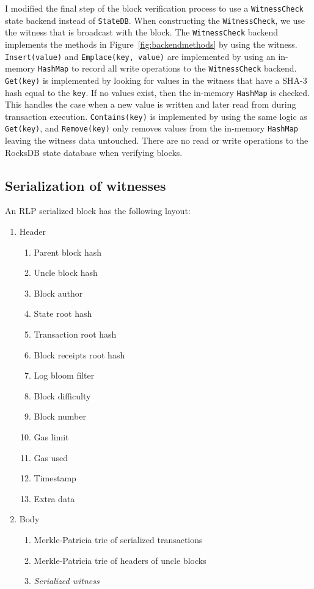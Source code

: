 \documentclass[12pt]{article}
\begin{document}
I modified the final step of the block verification process to use a \texttt{WitnessCheck} state backend instead of \texttt{StateDB}. When constructing the \texttt{WitnessCheck}, we use the witness that is broadcast with the block. The \texttt{WitnessCheck} backend implements the methods in Figure~\ref{fig:backendmethods} by using the witness. \texttt{Insert(value)} and \texttt{Emplace(key, value)} are implemented by using an in-memory \texttt{HashMap} to record all write operations to the \texttt{WitnessCheck} backend. \texttt{Get(key)} is implemented by looking for values in the witness that have a SHA-3 hash equal to the \texttt{key}. If no values exist, then the in-memory \texttt{HashMap} is checked. This handles the case when a new value is written and later read from during transaction execution. \texttt{Contains(key)} is implemented by using the same logic as \texttt{Get(key)}, and \texttt{Remove(key)} only removes values from the in-memory \texttt{HashMap} leaving the witness data untouched. There are no read or write operations to the RocksDB state database when verifying blocks.

\subsection{Serialization of witnesses}
An RLP serialized block has the following layout:
\begin{enumerate}
  \item Header
  \begin{enumerate}
    \item Parent block hash
    \item Uncle block hash
    \item Block author
    \item State root hash
    \item Transaction root hash
    \item Block receipts root hash
    \item Log bloom filter
    \item Block difficulty
    \item Block number
    \item Gas limit
    \item Gas used
    \item Timestamp
    \item Extra data
  \end{enumerate}
  \item Body
  \begin{enumerate}
    \item Merkle-Patricia trie of serialized transactions
    \item Merkle-Patricia trie of headers of uncle blocks
    \item \emph{Serialized witness}
  \end{enumerate}
\end{enumerate}
\end{document}
